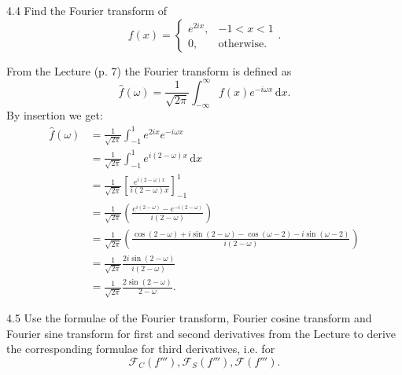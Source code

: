 \begin{problem}{4.4}
  Find the Fourier transform of
\[ 
f(x) = \begin{cases}
e^{2ix}, & -1 < x < 1\\
0, & \text{otherwise}
.\end{cases}
.\]
\end{problem}

\begin{derivation}
  From the Lecture (p. 7) the Fourier transform is defined as
  \begin{equation*}
    \hat{f}(\omega) = \frac{1}{\sqrt{2\pi}} \int_{-\infty}^{\infty} f(x) e^{-i\omega x} \, \mathrm{d}x 
  .\end{equation*}
  By insertion we get:
  \begin{align*}
    \hat{f}(\omega) &= \frac{1}{\sqrt{2\pi}} \int_{-1}^{1} e^{2ix} e^{-i\omega x} \\
    &= \frac{1}{\sqrt{2\pi}} \int_{-1}^{1} e^{i(2 - \omega)x} \, \mathrm{d}x \\
    &= \frac{1}{\sqrt{2\pi}} \left[ \frac{e^{i(2-\omega)x}}{i(2-\omega) x} \right]_{-1}^{1} \\
    &= \frac{1}{\sqrt{2\pi}} \left( \frac{e^{i (2-\omega)} - e^{-i (2 - \omega)} }{i (2 - \omega)} \right)\\
    &= \frac{1}{\sqrt{2\pi}} \left( \frac{\cos (2 - \omega) + i \sin (2 - \omega ) - \cos(\omega - 2) - i \sin (\omega - 2)}{i (2 -\omega)} \right) \\
    &= \frac{1}{\sqrt{2\pi}} \frac{2 i \sin (2 - \omega)}{i(2 - \omega)} \\
    &= \frac{1}{\sqrt{2\pi}} \frac{2 \sin (2 - \omega)}{2 - \omega}
  .\end{align*}
\end{derivation}


\begin{problem}{4.5}
  Use the formulae of the Fourier transform, Fourier cosine transform and Fourier sine transform for first and second derivatives from the Lecture to derive the corresponding formulae for third derivatives, i.e. for
\[ 
\mathcal{F}_C \left( f''' \right), \mathcal{F}_S \left( f''' \right), \mathcal{F} \left( f''' \right)
.\]
\end{problem}

